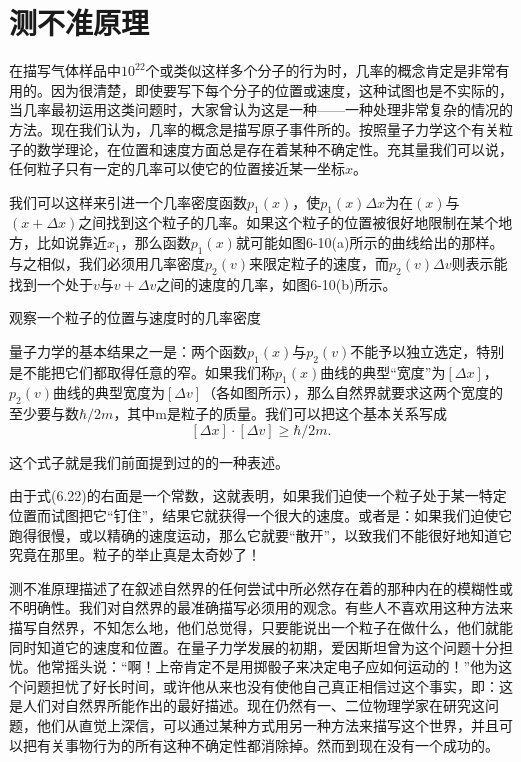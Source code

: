 \documentclass[12pt,oneside]{book}
\begin{document}
\section{测不准原理}
在描写气体样品中$10^{22}$个或类似这样多个分子的行为时，几率的概念肯定是非常有用的。因为很清楚，即使要写下每个分子的位置或速度，这种试图也是不实际的，当几率最初运用这类问题时，大家曾认为这是一种——一种处理非常复杂的情况的方法。现在我们认为，几率的概念是描写原子事件所的。按照量子力学这个有关粒子的数学理论，在位置和速度方面总是存在着某种不确定性。充其量我们可以说，任何粒子只有一定的几率可以使它的位置接近某一坐标$x$。

我们可以这样来引进一个几率密度函数$p_1(x)$，使$p_1(x)\Delta x$为在$(x)$与$(x+\Delta x)$之间找到这个粒子的几率。如果这个粒子的位置被很好地限制在某个地方，比如说靠近$x_1$，那么函数$p_1(x)$就可能如图6-10(a)所示的曲线给出的那样。与之相似，我们必须用几率密度$p_2(v)$来限定粒子的速度，而$p_2(v)\Delta v$则表示能找到一个处于$v$与$v+\Delta v$之间的速度的几率，如图6-10(b)所示。
\begin{fig}{观察一个粒子的位置与速度时的几率密度}
\caption{观察一个粒子的位置与速度时的几率密度}
\label{fig:观察一个粒子的位置与速度时的几率密度}
\end{fig}

量子力学的基本结果之一是：两个函数$p_1(x)$与$p_2(v)$不能予以独立选定，特别是不能把它们都取得任意的窄。如果我们称$p_1(x)$曲线的典型“宽度”为$[\Delta x]$，$p_2(v)$曲线的典型宽度为$[\Delta v]$（各如图所示），那么自然界就要求这两个宽度的至少要与数$\hbar/2m$，其中m是粒子的质量。我们可以把这个基本关系写成
\begin{equation}
\label{Eq:I:6:22}
[\Delta x]\cdot[\Delta v]\geq\hbar/2m.
\end{equation}

这个式子就是我们前面提到过的的一种表述。

由于式(6.22)的右面是一个常数，这就表明，如果我们迫使一个粒子处于某一特定位置而试图把它“钉住”，结果它就获得一个很大的速度。或者是：如果我们迫使它跑得很慢，或以精确的速度运动，那么它就要“散开”，以致我们不能很好地知道它究竟在那里。粒子的举止真是太奇妙了！

测不准原理描述了在叙述自然界的任何尝试中所必然存在着的那种内在的模糊性或不明确性。我们对自然界的最准确描写必须用的观念。有些人不喜欢用这种方法来描写自然界，不知怎么地，他们总觉得，只要能说出一个粒子在做什么，他们就能同时知道它的速度和位置。在量子力学发展的初期，爱因斯坦曾为这个问题十分担忧。他常摇头说：“啊！上帝肯定不是用掷骰子来决定电子应如何运动的！”他为这个问题担忧了好长时间，或许他从来也没有使他自己真正相信过这个事实，即：这是人们对自然界所能作出的最好描述。现在仍然有一、二位物理学家在研究这问题，他们从直觉上深信，可以通过某种方式用另一种方法来描写这个世界，并且可以把有关事物行为的所有这种不确定性都消除掉。然而到现在没有一个成功的。
\end{document}
